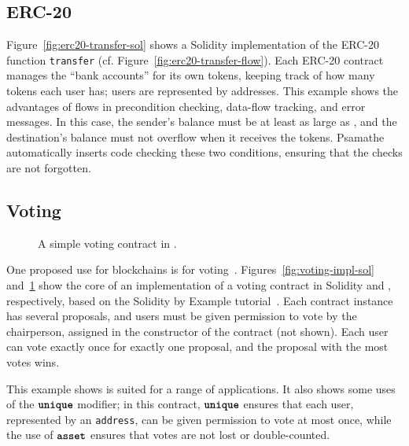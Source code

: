 \documentclass[nonacm, dvipsnames, sigconf]{acmart}
\begin{document}
\subsection{ERC-20}\label{sec:erc20-impl}
Figure~\ref{fig:erc20-transfer-sol} shows a Solidity implementation of the ERC-20 function \lstinline{transfer} (cf. Figure~\ref{fig:erc20-transfer-flow}).
Each ERC-20 contract manages the ``bank accounts'' for its own tokens, keeping track of how many tokens each user has; users are represented by addresses.
This example shows the advantages of flows in precondition checking, data-flow tracking, and error messages.
In this case, the sender's balance must be at least as large as , and the destination's balance must not overflow when it receives the tokens.
Psamathe automatically inserts code checking these two conditions, ensuring that the checks are not forgotten.

\subsection{Voting}\label{sec:voting-impl}
\begin{figure}[!b]
    \centering
    
    \caption{A simple voting contract in \langName.}
    \label{fig:voting-impl-flow}
\end{figure}
One proposed use for blockchains is for voting~\cite{Elsden18:Making}.
Figures~\ref{fig:voting-impl-sol} and~\ref{fig:voting-impl-flow} show the core of an implementation of a voting contract in Solidity and \langName, respectively, based on the Solidity by Example tutorial~\cite{solidityByExample}.
Each contract instance has several proposals, and users must be given permission to vote by the chairperson, assigned in the constructor of the contract (not shown).
Each user can vote exactly once for exactly one proposal, and the proposal with the most votes wins.

This example shows \langName is suited for a range of applications.
It also shows some uses of the $\textbf{\texttt{unique}}$ modifier; in this contract, $\textbf{\texttt{unique}}$ ensures that each user, represented by an \lstinline{address}, can be given permission to vote at most once, while the use of $\textbf{\texttt{asset}}$ ensures that votes are not lost or double-counted.
\end{document}
